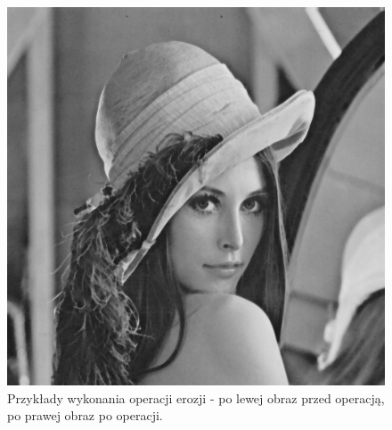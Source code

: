 \documentclass{article}
\begin{document}
\begin{figure}[!htb]
\includegraphics[scale=0.2]{img/Erozja_Obrazu_lena_8bit.png} 
\caption{Przykłady wykonania operacji erozji - po lewej obraz przed operacją, po prawej obraz po operacji. }
\end{figure}

\FloatBarrier
\end{document}
